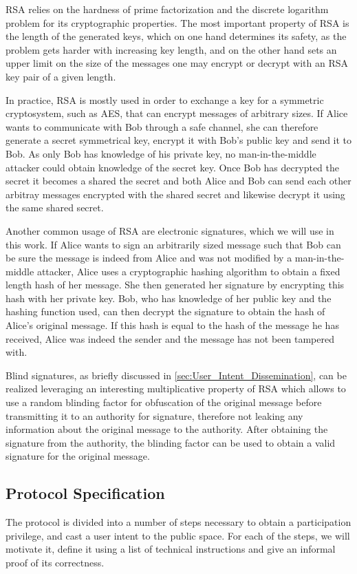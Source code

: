 RSA relies on the hardness of prime factorization and the discrete logarithm problem for its cryptographic properties.
The most important property of RSA is the length of the generated keys, which on one hand determines its safety, as the problem gets harder with increasing key length, and on the other hand sets an upper limit on the size of the messages one may encrypt or decrypt with an RSA key pair of a given length.

In practice, RSA is mostly used in order to exchange a key for a symmetric cryptosystem, such as AES, that can encrypt messages of arbitrary sizes.
If Alice wants to communicate with Bob through a safe channel, she can therefore generate a secret symmetrical key, encrypt it with Bob's public key and send it to Bob.
As only Bob has knowledge of his private key, no man-in-the-middle attacker could obtain knowledge of the secret key.
Once Bob has decrypted the secret it becomes a shared the secret and both Alice and Bob can send each other arbitray messages encrypted with the shared secret and likewise decrypt it using the same shared secret.

Another common usage of RSA are electronic signatures, which we will use in this work.
If Alice wants to sign an arbitrarily sized message such that Bob can be sure the message is indeed from Alice and was not modified by a man-in-the-middle attacker, Alice uses a cryptographic hashing algorithm to obtain a fixed length hash of her message.
She then generated her signature by encrypting this hash with her private key.
Bob, who has knowledge of her public key and the hashing function used, can then decrypt the signature to obtain the hash of Alice's original message.
If this hash is equal to the hash of the message he has received, Alice was indeed the sender and the message has not been tampered with.

Blind signatures, as briefly discussed in \autoref{sec:User_Intent_Dissemination}, can be realized leveraging an interesting multiplicative property of RSA which allows to use a random blinding factor for obfuscation of the original message before transmitting it to an authority for signature, therefore not leaking any information about the original message to the authority.
After obtaining the signature from the authority, the blinding factor can be used to obtain a valid signature for the original message.

\subsection{Protocol Specification}
The protocol is divided into a number of steps necessary to obtain a participation privilege, and cast a user intent to the public space. For each of the steps, we will motivate it, define it using a list of technical instructions and give an informal proof of its correctness.

